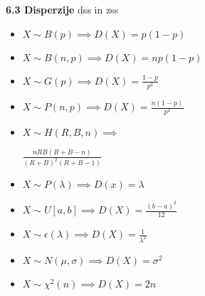 \documentclass{article}
\begin{document}
\begin{multicols}{2}
	\textbf{6.3 Disperzije} dss in zss
	\begin{itemize}
		\item \begin{math}
			      X \sim B(p) \implies D(X) = p(1 - p)
		      \end{math}
		\item \begin{math}
			      X \sim B(n, p) \implies D(X) = np(1 - p)
		      \end{math}
		\item \begin{math}
			      X \sim G(p) \implies D(X) = \frac{1 - p}{p^2}
		      \end{math}
		\item \begin{math}
			      X \sim P(n, p) \implies D(X) = \frac{n(1 - p)}{p^2}
		      \end{math}
		\item
		      \begin{math}
			      X \sim H(R, B, n) \implies
		      \end{math}
		      \begin{center}
			      \begin{math}
				      \frac{
					      nRB(R + B - n)
				      }{
					      (R + B)^2 (R + B - 1)
				      }
			      \end{math}
		      \end{center}
		\item \begin{math}
			      X \sim P(\lambda) \implies D(x) = \lambda
		      \end{math}
		\item \begin{math}
			      X \sim U[a, b] \implies D(X) = \frac{(b - a)^2}{12}
		      \end{math}
		\item  \begin{math}
			      X \sim \epsilon(\lambda) \implies D(X) = \frac{1}{\lambda^2}
		      \end{math}
		\item \begin{math}
			      X \sim N(\mu, \sigma ) \implies D(X) = \sigma^2
		      \end{math}
		\item \begin{math}
			      X \sim \chi^{2}(n) \implies D(X) = 2n
		      \end{math}
	\end{itemize}


\end{multicols}
\end{document}

